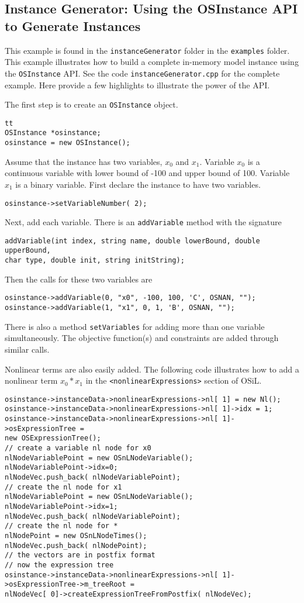\documentclass[11pt]{article}
\renewcommand{\_}{{\char"5F}}
\renewcommand{\{}{{\char"7B}}
\renewcommand{\}}{{\char"7D}}
\renewcommand{\^}{{\char"0D}}
\renewcommand{\'}{{\char"0D}}
\begin{document}
\subsection{Instance Generator: Using the OSInstance API to Generate Instances}\label{subsection:exampleOSInstanceGeneration}

This example is found in the {\tt instanceGenerator} folder in the {\tt examples} folder.  This example illustrates how to build a complete in-memory model instance using the {\tt OSInstance} API.   See the code {\tt instanceGenerator.cpp} for the complete example. Here provide a few highlights to illustrate the power of the API. 

The first step is to create an {\tt OSInstance} object.
\begin{verbatim}tt
OSInstance *osinstance;
osinstance = new OSInstance();
\end{verbatim}

Assume that the instance has two variables, $x_{0}$ and $x_{1}.$ Variable $x_{0}$ is a continuous variable with lower bound of -100 and upper bound of 100. Variable $x_{1}$ is a binary variable. First declare the instance to have two variables.
\begin{verbatim}
osinstance->setVariableNumber( 2);
\end{verbatim}
Next, add each variable. There is an {\tt addVariable} method with the signature
\begin{verbatim}
addVariable(int index, string name, double lowerBound, double upperBound, 
char type, double init, string initString);
\end{verbatim}
Then the calls for these two variables are
\begin{verbatim}
osinstance->addVariable(0, "x0", -100, 100, 'C', OSNAN, "");
osinstance->addVariable(1, "x1", 0, 1, 'B', OSNAN, "");
\end{verbatim}
There is also a method {\tt setVariables} for adding more than one variable simultaneously.  The objective function(s) and constraints are added through similar calls. 

Nonlinear terms are also easily added.  The following code illustrates how to add a nonlinear term $x_{0}*x_{1}$ in the {\tt <nonlinearExpressions>} section of  OSiL.
\begin{verbatim}
osinstance->instanceData->nonlinearExpressions->nl[ 1] = new Nl();
osinstance->instanceData->nonlinearExpressions->nl[ 1]->idx = 1;
osinstance->instanceData->nonlinearExpressions->nl[ 1]->osExpressionTree =
new OSExpressionTree();
// create a variable nl node for x0
nlNodeVariablePoint = new OSnLNodeVariable();
nlNodeVariablePoint->idx=0;
nlNodeVec.push_back( nlNodeVariablePoint);
// create the nl node for x1
nlNodeVariablePoint = new OSnLNodeVariable();
nlNodeVariablePoint->idx=1;
nlNodeVec.push_back( nlNodeVariablePoint);
// create the nl node for *
nlNodePoint = new OSnLNodeTimes();
nlNodeVec.push_back( nlNodePoint);
// the vectors are in postfix format
// now the expression tree
osinstance->instanceData->nonlinearExpressions->nl[ 1]->osExpressionTree->m_treeRoot =
nlNodeVec[ 0]->createExpressionTreeFromPostfix( nlNodeVec);
\end{verbatim}
\end{document}
